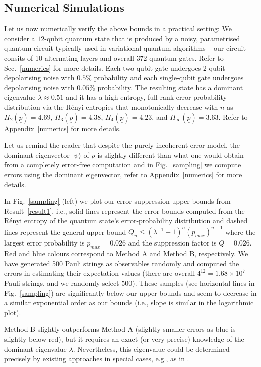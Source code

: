 \documentclass[aps,prx,showpacs,twocolumn,reprint]{revtex4-2}
\newcommand{\qn}{Q_n}
\begin{document}
\subsection{Numerical Simulations}
Let us now numerically verify the above bounds in a practical setting:
We consider a $12$-qubit quantum state that is produced by a noisy, parametrised
quantum circuit typically used in variational quantum algorithms -- our circuit consits
of 10 alternating layers and overall $372$ quantum gates. Refer to Sec.~\ref{numerics}
for more details. Each two-qubit gate undergoes
2-qubit depolarising noise with $0.5\%$ probability and each single-qubit gate undergoes
depolarising noise with $0.05\%$ probability.
The resulting state has a dominant eigenvalue $\lambda \approx 0.51$
and it has a high entropy, full-rank error probability distribution via the R{\'e}nyi entropies
that monotonically decrease with $n$ as
$H_2(\underline{p}) = 4.69$, $H_3(\underline{p}) = 4.38$, $H_4(\underline{p}) = 4.23$,
and $H_\infty(\underline{p}) = 3.63$. Refer to Appendix~\ref{numerics} for more details.

Let us remind the reader that despite the purely incoherent error model, the dominant
eigenvector $| \psi \rangle$ of $\rho$ is slightly different than
what one would obtain from a completely error-free computation 
and in Fig.~\ref{sampling} we compute errors using the dominant eigenvector,
refer to Appendix~\ref{numerics} for more details.

In Fig.~\ref{sampling} (left) we plot our error suppression upper bounds from Result~\ref{result1},
i.e., solid lines represent the error bounds computed from the R{\'e}nyi entropy of the
quantum state's error-probability distribution and dashed lines represent the general
upper bound $\qn \leq (\lambda^{-1}{-}1)^n (p_{max})^{n-1}$ 
where the largest error probability is $p_{max}=0.026$
and the suppression factor is $Q = 0.026$.
Red and blue colours correspond to Method A and Method B, respectively.
We have generated 500 Pauli strings as observables randomly and computed
the errors in estimating their expectation values (there are overall $4^{12} = 1.68 \times 10^7$ Pauli strings,
and we randomly select $500$). These samples
(see horizontal lines in Fig.~\ref{sampling}) are significantly below our upper
bounds and seem to decrease in a similar exponential order
as our bounds (i.e., slope is similar in the logarithmic plot). 

Method B slightly outperforms Method A (slightly smaller errors as blue is slightly below red),
but it requires an exact (or very precise) knowledge of the dominant eigenvalue
$\lambda$. Nevertheless, this eigenvalue could be determined precisely by existing
approaches in special cases, e.g., as in \cite{harper2020fast}.
\end{document}
